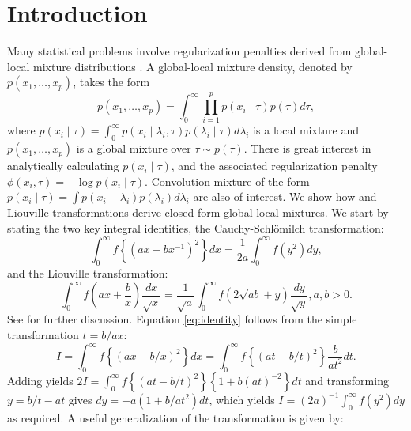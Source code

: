 \documentclass[lineno]{biometrika}
\begin{document}
\section{Introduction}
Many statistical problems involve regularization penalties derived from global-local mixture distributions \citep{polson2011data, hans2011comment,bhadra2015horseshoe+}. A global-local mixture density, denoted by $p(x_1, \ldots, x_p)$, takes the form 
\begin{equation*}
p(x_1, \ldots, x_p) = \int_{0}^{\infty}\prod_{i=1}^{p}  p(x_i \mid \tau) p(\tau) d\tau, 
\end{equation*}
where $p(x_i \mid \tau) = \int_{0}^{\infty} p(x_i \mid \lambda_i, \tau) p(\lambda_i \mid \tau) d\lambda_i$ is a local mixture and $p(x_1, \ldots, x_p)$ is a global mixture over $\tau \sim p(\tau)$. There is great interest in analytically calculating $p(x_i \mid \tau)$, and the associated regularization penalty $\phi(x_i, \tau) = -\log p(x_i \mid \tau)$. Convolution mixture of the form $p(x_i \mid \tau) = \int p(x_i - \lambda_i) p(\lambda_i) d \lambda_i$ are also of interest. We show how \CS and Liouville transformations derive closed-form global-local mixtures. 
We start by stating the two key integral identities, the Cauchy-Schl\"omilch transformation: 
\begin{equation}
\int_0^\infty f \left\{ ( a x - b x^{-1} )^2 \right\} d x = \frac{1}{2a} \int_0^\infty f(y^2) d y, \label{eq:identity}
\end{equation}
and the Liouville transformation:
\begin{equation}
\int_{0}^{\infty} f\left(ax + \frac{b}{x} \right) \frac{dx}{\sqrt{x}} = \frac{1}{\sqrt{a}} \int_{0}^{\infty} f \left( 2\sqrt{ab} + y \right) \frac{dy}{\sqrt{y}}, a,b >0. \label{eq:liouville}
\end{equation}
See \cite{boros2006irresistible,baker2008probabilistic,amdeberhan2010cauchy,jones2014generating} for further discussion.  
Equation \eqref{eq:identity} follows from the simple transformation $t = b/ax$: 
\begin{equation*}
  I = \int_{0}^{\infty} f \left\{(ax - b/x)^2 \right\} dx = \int_{0}^{\infty} f \left\{(at - b/t)^2 \right\} \frac{b}{at^2} dt.
\end{equation*}
Adding yields $2 I = \int_{0}^{\infty} f \left\{(at - b/t)^2 \right\} \left\{ 1+b (at)^{-2} \right\} dt$ and transforming $y = b/t - at$ gives $dy = -a (1+b/at^2) dt$, which yields $I = (2a)^{-1} \int_{0}^{\infty} f(y^2) dy$ as required. A useful generalization of the \CS transformation is given by: 
\end{document}
